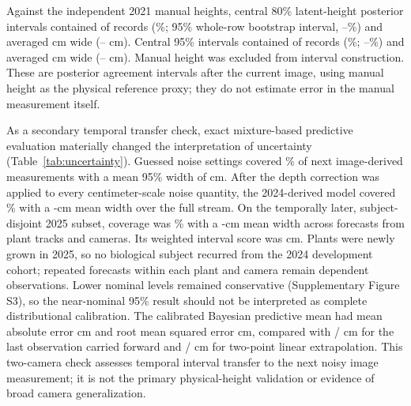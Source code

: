 \documentclass[12pt,letterpaper]{article}
\begin{document}
Against the independent 2021 manual heights, central 80\% latent-height posterior intervals contained \FieldCoveredEighty{} of \FieldN{} records (\FieldCoverageEighty{}\%; 95\% whole-row bootstrap interval, \FieldCoverageEightyLo{}--\FieldCoverageEightyHi{}\%) and averaged \FieldIntervalWidthEighty{} cm wide (\FieldIntervalWidthEightyLo{}--\FieldIntervalWidthEightyHi{} cm). Central 95\% intervals contained \FieldCoveredNinetyFive{} of \FieldN{} records (\FieldCoverageNinetyFive{}\%; \FieldCoverageNinetyFiveLo{}--\FieldCoverageNinetyFiveHi{}\%) and averaged \FieldIntervalWidthNinetyFive{} cm wide (\FieldIntervalWidthNinetyFiveLo{}--\FieldIntervalWidthNinetyFiveHi{} cm). Manual height was excluded from interval construction. These are posterior agreement intervals after the current image, using manual height as the physical reference proxy; they do not estimate error in the manual measurement itself.

As a secondary temporal transfer check, exact mixture-based predictive evaluation materially changed the interpretation of uncertainty (Table~\ref{tab:uncertainty}). Guessed noise settings covered \GuessedCoverage{}\% of next image-derived measurements with a mean 95\% width of \GuessedWidth{} cm. After the depth correction was applied to every centimeter-scale noise quantity, the 2024-derived model covered \CalibratedCoverage{}\% with a \CalibratedWidth{}-cm mean width over the full stream. On the temporally later, subject-disjoint 2025 subset, coverage was \UncertaintyTestCoverageNinetyFive{}\% with a \UncertaintyTestWidthNinetyFive{}-cm mean width across \UncertaintyTestN{} forecasts from \UncertaintyTestPlants{} plant tracks and \UncertaintyTestCameras{} cameras. Its weighted interval score was \UncertaintyTestWIS{} cm. Plants were newly grown in 2025, so no biological subject recurred from the 2024 development cohort; repeated forecasts within each plant and camera remain dependent observations. Lower nominal levels remained conservative (Supplementary Figure S3), so the near-nominal 95\% result should not be interpreted as complete distributional calibration. The calibrated Bayesian predictive mean had mean absolute error \ForecastBayesMAE{} cm and root mean squared error \ForecastBayesRMSE{} cm, compared with \ForecastLastMAE{}/\ForecastLastRMSE{} cm for the last observation carried forward and \ForecastLinearMAE{}/\ForecastLinearRMSE{} cm for two-point linear extrapolation. This two-camera check assesses temporal interval transfer to the next noisy image measurement; it is not the primary physical-height validation or evidence of broad camera generalization.
\end{document}
